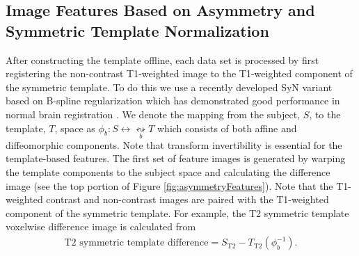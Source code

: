
\subsection{Image Features Based on Asymmetry and Symmetric Template Normalization}

After constructing the template offline, each data set is processed
by first registering the non-contrast T1-weighted image to the T1-weighted
component of the symmetric template.  To do this we use a recently developed 
SyN \citep{avants2011a} variant based on B-spline regularization 
which has demonstrated good performance in normal brain registration \citep{tustison2013a}.
We denote the mapping from the subject, $S$, to the template, $T$,
space as $\phi_b: S \leftrightarrow \underset{b}{\leftrightsquigarrow}  T$
which consists of both affine and diffeomorphic components.  Note that transform
invertibility is essential for the template-based features.  The first 
set of feature images is generated by warping the template components 
to the subject space and calculating the difference image (see the 
top portion of Figure \ref{fig:asymmetryFeatures}).  
Note that the T1-weighted contrast and non-contrast images are paired with
the T1-weighted component of the symmetric template.
For example,
the T2 symmetric template voxelwise difference image is calculated from
\begin{align}
  \mathrm{T2}\,\,\mathrm{symmetric}\,\,\mathrm{template}\,\,\mathrm{difference} = S_{\mathrm{T2}} - T_{\mathrm{T2}}\left(\phi_b^{-1}\right).
\end{align}

